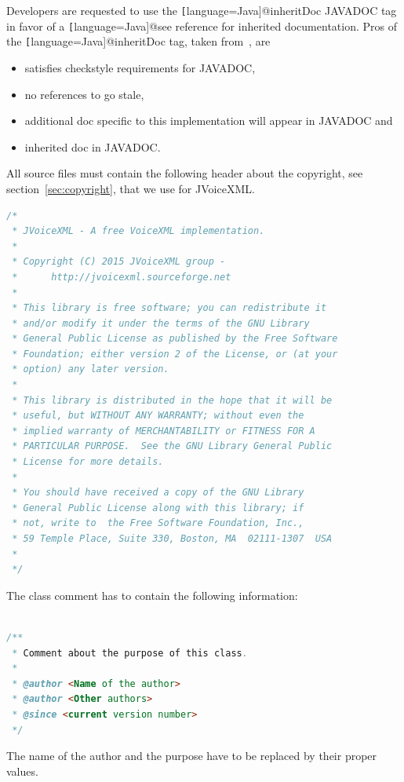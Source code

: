 \documentclass[11pt,a4paper]{article}
\begin{document}
Developers are requested to use the \texttt[language=Java]{@inheritDoc}
JAVADOC tag in favor of a \texttt[language=Java]{@see} reference for inherited documentation.
Pros of the \texttt[language=Java]{@inheritDoc} tag, taken 
from~\cite{tauber:inheritdoc}, are
\begin{itemize}
\item satisfies checkstyle requirements for JAVADOC,
\item no references to go stale,
\item additional doc specific to this implementation will appear in JAVADOC and
\item inherited doc in JAVADOC.
\end{itemize}

All source files must contain the following header about the 
copyright, see section~\ref{sec:copyright}, that we use for JVoiceXML.

\begin{lstlisting}[language=Java]
/*
 * JVoiceXML - A free VoiceXML implementation.
 *
 * Copyright (C) 2015 JVoiceXML group - 
 *      http://jvoicexml.sourceforge.net
 *
 * This library is free software; you can redistribute it 
 * and/or modify it under the terms of the GNU Library 
 * General Public License as published by the Free Software 
 * Foundation; either version 2 of the License, or (at your 
 * option) any later version.
 *
 * This library is distributed in the hope that it will be 
 * useful, but WITHOUT ANY WARRANTY; without even the 
 * implied warranty of MERCHANTABILITY or FITNESS FOR A 
 * PARTICULAR PURPOSE.  See the GNU Library General Public 
 * License for more details.
 *
 * You should have received a copy of the GNU Library 
 * General Public License along with this library; if 
 * not, write to  the Free Software Foundation, Inc., 
 * 59 Temple Place, Suite 330, Boston, MA  02111-1307  USA
 *
 */
\end{lstlisting}

The class comment has to contain the following information:

\begin{lstlisting}[language=Java]

/**
 * Comment about the purpose of this class.
 *
 * @author <Name of the author>
 * @author <Other authors>
 * @since <current version number>
 */
\end{lstlisting}

The name of the author and the purpose have to be replaced by their proper
values.
\end{document}
